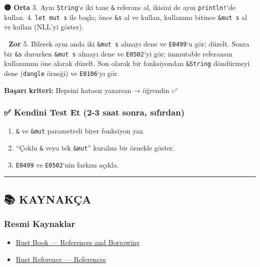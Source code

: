 \documentclass[12pt,a4paper]{article}
\begin{document}
\textbf{🟡 Orta}
3. Aynı \texttt{String}`e iki tane \texttt{\&} referans al, ikisini de aynı \texttt{println!}`de kullan.
4. \texttt{let\ mut\ s} ile başla; önce \texttt{\&s} al ve kullan, kullanımı bitince \texttt{\&mut\ s} al ve kullan (NLL'yi göster).

\textbf{🔴 Zor}
5. Bilerek aynı anda iki \texttt{\&mut\ s} almayı dene ve \texttt{E0499}`u gör; düzelt. Sonra bir \texttt{\&s} dururken \texttt{\&mut\ s} almayı dene ve \texttt{E0502}`yi gör; immutable referansın kullanımını öne alarak düzelt. Son olarak bir fonksiyondan \texttt{\&String} döndürmeyi dene (\texttt{dangle} örneği) ve \texttt{E0106}`yı gör.

\textbf{Başarı kriteri:} Hepsini hatasız yazarsan → öğrendin ✅

\subsubsection{✅ Kendini Test Et (2-3 saat sonra, sıfırdan)}\label{kendini-test-et-2-3-saat-sonra-sıfırdan-11}

\begin{enumerate}
\def\labelenumi{\arabic{enumi}.}
\tightlist
\item
  \texttt{\&} ve \texttt{\&mut} parametreli birer fonksiyon yaz.
\item
  ``Çoklu \texttt{\&} veya tek \texttt{\&mut}'' kuralını bir örnekle göster.
\item
  \texttt{E0499} ve \texttt{E0502}`nin farkını açıkla.
\end{enumerate}

\begin{center}\rule{0.5\linewidth}{0.5pt}\end{center}

\subsection{📚 KAYNAKÇA}\label{kaynakça-11}

\subsubsection{Resmi Kaynaklar}\label{resmi-kaynaklar-11}

\begin{itemize}
\tightlist
\item
  \href{https://doc.rust-lang.org/book/ch04-02-references-and-borrowing.html}{Rust Book --- References and Borrowing}
\item
  \href{https://doc.rust-lang.org/reference/types/pointer.html\#shared-references-}{Rust Reference --- References}
\end{itemize}
\end{document}
